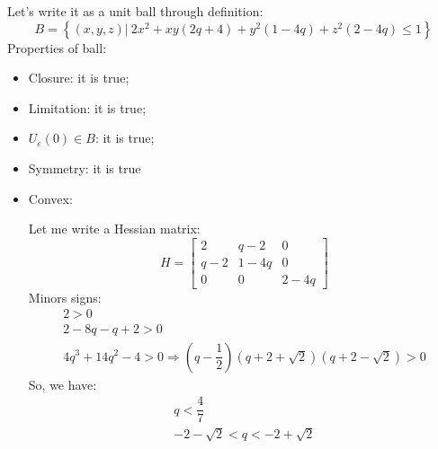 \documentclass[12pt]{report}
\begin{document}
\begin{solution}
   Let's write it as a unit ball through definition:
   \[
      B = \left\{(x,y,z)| \ 2x^2 + xy(2q+4) + y^2 (1-4q) + z^2 (2-4q) \leq 1\right\} 
   \]
    Properties of ball:
    \begin{itemize}
      \item Closure: it is {\color{green}true};
      \item Limitation: it is {\color{green}true};
      \item $U_\varepsilon(0) \in B$: it is {\color{green} true};
      \item Symmetry: it is {\color{green} true}
      \item Convex:
      \par
      Let me write a Hessian matrix:
      \[
         H = \begin{bmatrix}
            2 & q-2 & 0\\
            q-2 & 1-4q & 0\\
            0 & 0 & 2-4q
         \end{bmatrix} 
      \]
      Minors signs:
      \[
         \begin{array}{c}
            2 > 0\\
            2-8q - q + 2 > 0 \\
            4q^3 + 14q^2 - 4 > 0 \Longrightarrow
            \left(q-\dfrac{1}{2}\right)\left(q+2+\sqrt{2}\right)(q+2-\sqrt{2}) > 0
         \end{array} 
      \]
      So, we have:
      \[
         \begin{array}{c}
            q < \dfrac{4}{7} \\
            -2-\sqrt{2} < q < -2 + \sqrt{2} \\


\end{array}\]
\end{itemize}
\end{solution}
\end{document}
